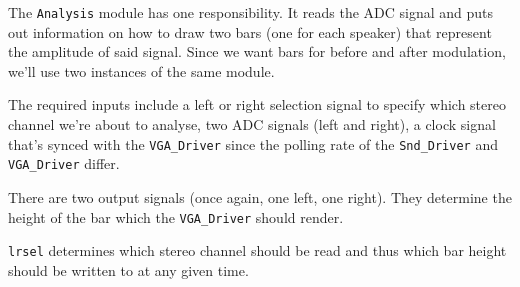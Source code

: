 The \verb=Analysis= module has one responsibility. It reads the ADC signal and puts out information on how to draw two bars (one for each speaker) that represent the amplitude of said signal. Since we want bars for before and after modulation, we'll use two instances of the same module. 

The required inputs include a left or right selection signal to specify which stereo channel we're about to analyse, two ADC signals (left and right), a clock signal that's synced with the \verb=VGA_Driver= since the polling rate of the \verb=Snd_Driver= and \verb=VGA_Driver= differ.  

There are two output signals (once again, one left, one right). They determine the height of the bar which the \verb=VGA_Driver= should render. 

\verb=lrsel= determines which stereo channel should be read and thus which bar height should be written to at any given time.

